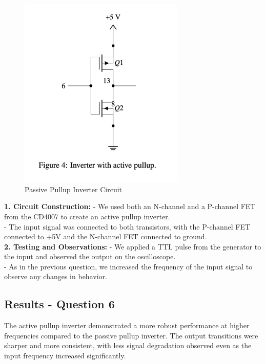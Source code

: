 \documentclass{article}
\begin{document}
    \begin{figure}[H]
        \centering
        \includegraphics[width=0.7\textwidth]{./img/Lab 10/10_6_1.png}
        \caption{Passive Pullup Inverter Circuit}
        \label{fig:passive_pullup_inverter}
    \end{figure}

    \textbf{1. Circuit Construction:}
       - We used both an N-channel and a P-channel FET from the CD4007 to create an active pullup inverter.
       \\
       - The input signal was connected to both transistors, with the P-channel FET connected to +5V and the N-channel FET connected to ground.
       \\

    \textbf{2. Testing and Observations:}
       - We applied a TTL pulse from the generator to the input and observed the output on the oscilloscope.
       \\
       - As in the previous question, we increased the frequency of the input signal to observe any changes in behavior.
       \\

    \subsection*{\textbf{Results - Question 6}}
    The active pullup inverter demonstrated a more robust performance at higher frequencies compared to the passive pullup inverter. The output transitions were sharper and more consistent, with less signal degradation observed even as the input frequency increased significantly.
\end{document}
